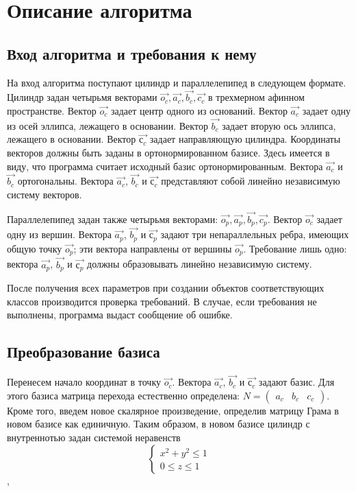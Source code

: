 \documentclass[pdftex,ptm,12pt,a4paper]{report}
\begin{document}
\chapter{Описание алгоритма}
    \section{Вход алгоритма и требования к нему}
      На вход алгоритма поступают цилиндр и параллелепипед в следующем формате.
      Цилиндр задан четырьмя векторами $\vec{o_c}, \vec{a_c}, \vec{b_c}, \vec{c_c}$ в трехмерном афинном пространстве.
      Вектор $\vec{o_c}$ задает центр одного из оснований.
      Вектор $\vec{a_c}$ задает одну из осей эллипса, лежащего в основании.
      Вектор $\vec{b_c}$ задает вторую ось эллипса, лежащего в основании.
      Вектор $\vec{с_c}$ задает направляющую цилиндра.
      Координаты векторов должны быть заданы в ортонормированном базисе.
      Здесь имеется в виду, что программа считает исходный базис ортонормированным.
      Вектора $\vec{a_c}$ и $\vec{b_c}$ ортогональны.
      Вектора $\vec{a_c}$, $\vec{b_c}$ и $\vec{с_c}$ представляют собой линейно независимую систему векторов.

      Параллелепипед задан также четырьмя векторами: $\vec{o_p}, \vec{a_p}, \vec{b_p}, \vec{c_p}$.
      Вектор $\vec{o_c}$ задает одну из вершин.
      Вектора $\vec{a_p}$, $\vec{b_p}$ и $\vec{с_p}$ задают три непараллельных ребра, имеющих общую точку $\vec{o_p}$; эти вектора направлены от вершины $\vec{o_p}$.
      Требование лишь одно: вектора $\vec{a_p}$, $\vec{b_p}$ и $\vec{с_p}$ должны образовывать линейно независимую систему.

      После получения всех параметров при создании объектов соответствующих классов производится проверка требований.
      В случае, если требования не выполнены, программа выдаст сообщение об ошибке.
\section{Преобразование базиса}
      Перенесем начало координат в точку $\vec{o_c}$.
      Вектора $\vec{a_c}$, $\vec{b_c}$ и $\vec{с_c}$ задают базис.
      Для этого базиса матрица перехода естественно определена:
      $N = \begin{pmatrix} {a_c} & {b_c} & c_{c} \end{pmatrix}$.
      Кроме того, введем новое скалярное произведение, определив матрицу Грама в новом базисе как единичную.
      Таким образом, в новом базисе цилиндр с внутреннотью задан системой неравенств
      \begin{equation}\label{cnb}
          \begin{cases}
          x^2 + y^2   \le  1  \\
          0 \le  z   \le  1
          \end{cases}
      \end{equation},
\end{document}
